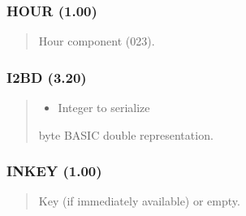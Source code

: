 \documentclass[letterpaper,10pt,english]{sphinxmanual}
\begin{document}
\subsubsection{HOUR (1.00)}
\label{\detokenize{ppl:hour-1-00}}\begin{quote}

\sphinxAtStartPar
{}
\begin{description}
\sphinxAtStartPar
Hour component (0\textendash{}23).

\end{description}
\end{quote}


\subsubsection{I2BD (3.20)}
\label{\detokenize{ppl:i2bd-3-20}}\begin{quote}

\sphinxAtStartPar
{}
\begin{description}
\begin{itemize}
\item {} 
\sphinxAtStartPar
{} \textendash{} Integer to serialize

\end{itemize}

\sphinxhyphen{}byte BASIC double representation.

\end{description}
\end{quote}


\subsubsection{INKEY (1.00)}
\label{\detokenize{ppl:inkey-1-00}}\begin{quote}

\sphinxAtStartPar
{}
\begin{description}
\sphinxAtStartPar
Key (if immediately available) or empty.

\end{description}
\end{quote}
\end{document}
